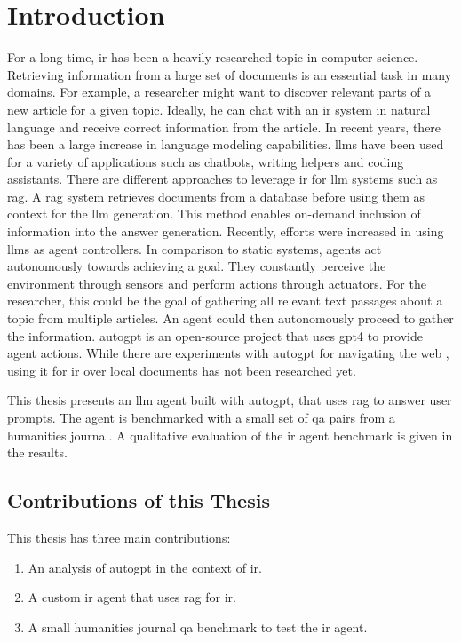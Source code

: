 \documentclass[../main.tex]{subfiles}
\begin{document}
\chapter{Introduction}
\label{ch:introduction}

For a long time, \gls{ir} has been a heavily researched topic in computer science.
Retrieving information from a large set of documents is an essential task in many domains.
For example,
a researcher might want to discover relevant parts of a new article for a given topic.
Ideally, he can chat with an \gls{ir} system in natural language
and receive correct information from the article.
In recent years, there has been a large increase in language modeling capabilities.
\Glspl{llm} have been used for a variety of applications such as chatbots,
writing helpers and coding assistants.
There are different approaches to leverage \gls{ir} for \gls{llm} systems such as \gls{rag}.
A \Gls{rag} system retrieves documents from a database before using them as context
for the \gls{llm} generation.
This method enables on-demand inclusion of information into the answer generation.
Recently, efforts were increased in using \glspl{llm} as agent controllers.
In comparison to static systems, agents act autonomously towards achieving a goal.
They constantly perceive the environment through sensors and perform actions
through actuators.
For the researcher,
this could be the goal of gathering all relevant text passages about a topic from
multiple articles.
An agent could then autonomously proceed to gather the information.
\Gls{autogpt} is an open-source project that uses \gls{gpt4} to provide agent
actions.
While there are experiments with \gls{autogpt} for navigating the web \cite{Yang2023},
using it for \gls{ir} over local documents has not been researched yet.

This thesis presents an \gls{llm} agent built with \gls{autogpt},
that uses \gls{rag} to answer user prompts.
The agent is benchmarked with a small set of \gls{qa} pairs from a humanities journal.
A qualitative evaluation of the \gls{ir} agent benchmark is given in the results.

\section{Contributions of this Thesis}

This thesis has three main contributions:
\begin{enumerate}
    \item An analysis of \gls{autogpt} in the context of \gls{ir}.
    \item A custom \gls{ir} agent that uses \gls{rag} for \gls{ir}.
    \item A small humanities journal \gls{qa} benchmark to test the \gls{ir} agent.
\end{enumerate}
\end{document}
